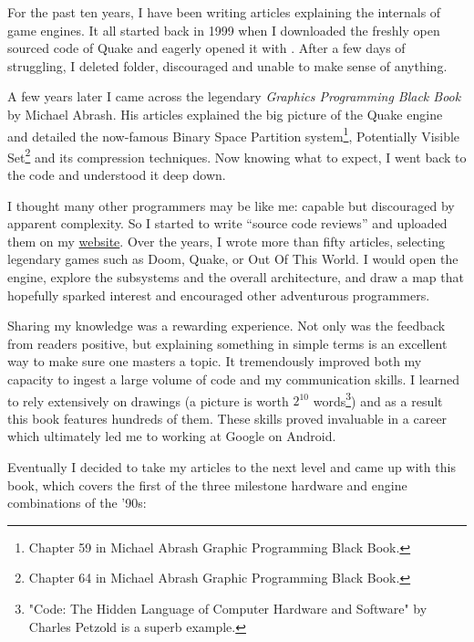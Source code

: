 \documentclass[book.tex]{subfiles}
\begin{document}
For the past ten years, I have been writing articles explaining the internals of game engines. It all started back in 1999 when I downloaded the freshly open sourced code of \mbox{Quake} and eagerly opened it with . After a few days of struggling, I deleted  folder, discouraged and unable to make sense of anything.

\bigskip

A few years later I came across the legendary \textit{Graphics Programming Black Book} by Michael Abrash. His articles explained the big picture of the Quake engine and detailed the now-famous Binary Space Partition system\footnote{Chapter 59 in Michael Abrash Graphic Programming Black Book.}, Potentially Visible Set\footnote{Chapter 64 in Michael Abrash Graphic Programming Black Book.} and its compression techniques. Now knowing what to expect, I went back to the code and understood it deep down.

\bigskip

I thought many other programmers may be like me: capable but discouraged by apparent complexity. So I started to write ``source  code reviews'' and uploaded them on my
\href{http://fabiensanglard.net}{website}. Over the years, I wrote more than fifty articles, selecting legendary games such as Doom, Quake, or Out Of This World. I would open the engine, explore the subsystems and the overall architecture, and draw a map that hopefully sparked interest and encouraged other adventurous programmers.

\bigskip

Sharing my knowledge was a rewarding experience. Not only was the feedback from readers positive, but explaining something in simple terms is an excellent way to make sure one masters a topic. It tremendously improved both my capacity to ingest a large volume of code and my communication skills. I learned to rely extensively on drawings (a picture is worth $2^{10}$ words\footnote{"Code: The Hidden Language of Computer Hardware and Software" by Charles Petzold is a superb example.}) and as a result this book features hundreds of them. These skills proved invaluable in a career which ultimately led me to working at Google on Android.\\
\par

Eventually I decided to take my articles to the next level and came up with this book, which covers the first of the three milestone hardware and engine combinations of the '90s:
\pagebreak
\end{document}
